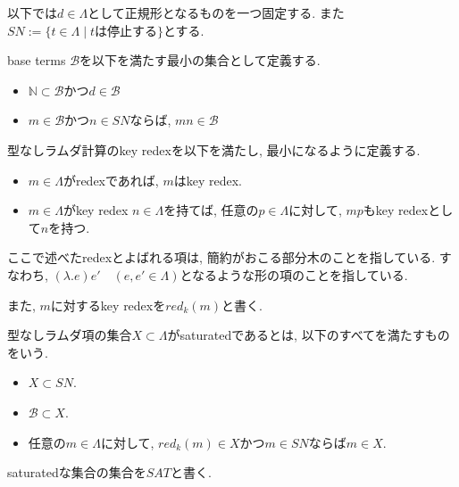 \documentclass[12pt]{ltjsarticle}
\begin{document}
以下では$d \in \Lambda$として正規形となるものを一つ固定する. また$SN := \{ t \in \Lambda \mid t \text{は停止する}\}$とする.

\begin{defn}
 base terms $\mathcal{B}$を以下を満たす最小の集合として定義する.
 \begin{itemize}
  \item $\mathbb{N} \subset \mathcal{B}$かつ$d \in \mathcal{B}$
  \item $m \in \mathcal{B}$かつ$n \in SN$ならば, $mn \in \mathcal{B}$
 \end{itemize}
\end{defn}

\begin{defn}
 型なしラムダ計算のkey redexを以下を満たし, 最小になるように定義する.
 \begin{itemize}
  \item $m \in \Lambda$がredexであれば, $m$はkey redex.
  \item $m \in \Lambda$がkey redex $n \in \Lambda$を持てば, 任意の$p \in \Lambda$に対して, $m p$もkey redexとして$n$を持つ.
 \end{itemize}
ここで述べたredexとよばれる項は, 簡約がおこる部分木のことを指している. すなわち, $(\lambda. e) e' \quad (e, e' \in \Lambda)$となるような形の項のことを指している.
 
また, $m$に対するkey redexを$red_k(m)$と書く.
\end{defn}

\begin{defn}\label{ss}
 型なしラムダ項の集合$X \subset \Lambda$がsaturatedであるとは, 以下のすべてを満たすものをいう.
 \begin{itemize}
  \item $X \subset SN$.
  \item $\mathcal{B} \subset X$.
  \item 任意の$m \in \Lambda$に対して, $red_k(m) \in X$かつ$m \in SN$ならば$m \in X$.
 \end{itemize}
 saturatedな集合の集合を$SAT$と書く.
\end{defn}
\end{document}
